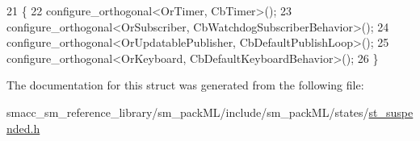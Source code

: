 \begin{DoxyCode}
21     \{
22         configure\_orthogonal<OrTimer, CbTimer>();   
23         configure\_orthogonal<OrSubscriber, CbWatchdogSubscriberBehavior>();
24         configure\_orthogonal<OrUpdatablePublisher, CbDefaultPublishLoop>();
25         configure\_orthogonal<OrKeyboard, CbDefaultKeyboardBehavior>();
26     \}
\end{DoxyCode}


The documentation for this struct was generated from the following file\+:\begin{DoxyCompactItemize}
\item 
smacc\+\_\+sm\+\_\+reference\+\_\+library/sm\+\_\+pack\+M\+L/include/sm\+\_\+pack\+M\+L/states/\hyperlink{st__suspended_8h}{st\+\_\+suspended.\+h}\end{DoxyCompactItemize}
